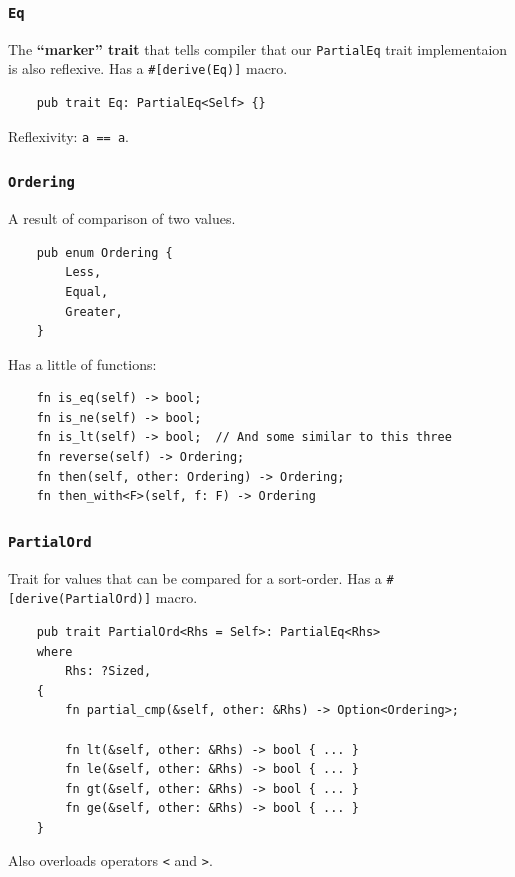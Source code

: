 \documentclass[aspectratio=1610,t]{beamer}
\begin{document}

\begin{frame}[fragile]
\frametitle{\texttt{Eq}}
The \textbf{``marker'' trait} that tells compiler that our \texttt{PartialEq} trait implementaion is also reflexive. Has a \texttt{\#[derive(Eq)]} macro.

\begin{verbatim}
    pub trait Eq: PartialEq<Self> {}
\end{verbatim}

Reflexivity: \texttt{a == a}.
\end{frame}


\begin{frame}[fragile]
\frametitle{\texttt{Ordering}}
A result of comparison of two values.

\begin{verbatim}
    pub enum Ordering {
        Less,
        Equal,
        Greater,
    }
\end{verbatim}

Has a little of functions:

\begin{verbatim}
    fn is_eq(self) -> bool;
    fn is_ne(self) -> bool;
    fn is_lt(self) -> bool;  // And some similar to this three
    fn reverse(self) -> Ordering;
    fn then(self, other: Ordering) -> Ordering;
    fn then_with<F>(self, f: F) -> Ordering
\end{verbatim}
\end{frame}


\begin{frame}[fragile]
\frametitle{\texttt{PartialOrd}}
Trait for values that can be compared for a sort-order. Has a \texttt{\#[derive(PartialOrd)]} macro.

\begin{verbatim}
    pub trait PartialOrd<Rhs = Self>: PartialEq<Rhs> 
    where
        Rhs: ?Sized, 
    {
        fn partial_cmp(&self, other: &Rhs) -> Option<Ordering>;

        fn lt(&self, other: &Rhs) -> bool { ... }
        fn le(&self, other: &Rhs) -> bool { ... }
        fn gt(&self, other: &Rhs) -> bool { ... }
        fn ge(&self, other: &Rhs) -> bool { ... }
    }
\end{verbatim}

Also overloads operators \texttt{<} and \texttt{>}.
\end{frame}
\end{document}
